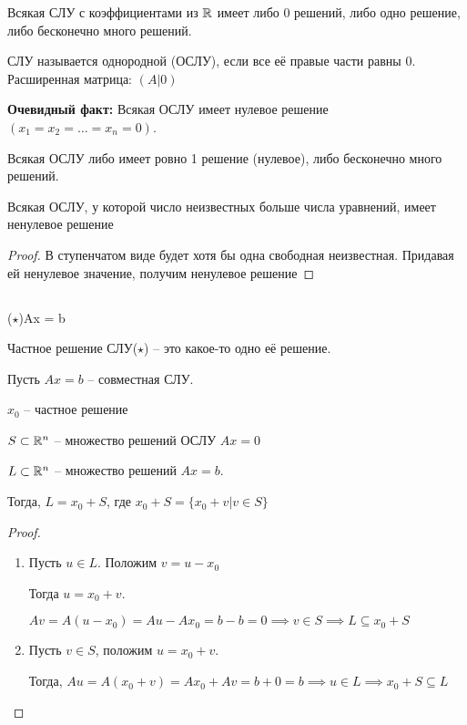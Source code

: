 \begin{consequence}
    Всякая СЛУ с коэффициентами из $\mathbb{R}$ имеет либо 0 решений, либо одно решение, либо бесконечно много решений.
\end{consequence}

\begin{definition}
    СЛУ называется однородной (ОСЛУ), если все её правые части равны 0. Расширенная матрица: $(A | 0)$ 
\end{definition}

\textbf{Очевидный факт: } Всякая ОСЛУ имеет нулевое решение $(x_1 = x_2 = \dots = x_n = 0)$.

\begin{consequence}
    Всякая ОСЛУ либо имеет ровно 1 решение (нулевое), либо бесконечно много решений.
\end{consequence}

\begin{consequence}
    Всякая ОСЛУ, у которой число неизвестных больше числа уравнений, имеет ненулевое решение
\end{consequence}

\begin{proof}
    В ступенчатом виде будет хотя бы одна свободная неизвестная. Придавая ей ненулевое значение, получим ненулевое решение
\end{proof}

\subsection{} %

($\star$)Ax = b

Частное решение СЛУ($\star$) -- это какое-то одно её решение.

\begin{statement}
    Пусть $Ax = b$ -- совместная СЛУ.

    $x_0$ -- частное решение

    $S \subset \mathbb{R}^n$ -- множество решений ОСЛУ $Ax = 0$

    $L \subset \mathbb{R}^n $ -- множество решений $Ax = b$.

    Тогда, $L = x_0 + S$, где $x_0 + S = \{x_0 + v | v \in S\}$
\end{statement}

\begin{proof}~
    \begin{enumerate}
    \item 
        Пусть $u \in L$. 
        Положим $v = u - x_0$

        Тогда $u = x_0 + v$. 

        $Av = A(u - x_0) = Au - Ax_0 = b - b = 0 \implies v \in S \implies L \subseteq x_0 + S$

    \item
        Пусть $v \in S$, положим $u = x_0 + v$.

        Тогда, $Au = A(x_0 + v) = Ax_0 + Av = b + 0 = b \implies u \in L \implies x_0 + S \subseteq L$
    \end{enumerate}
\end{proof}

